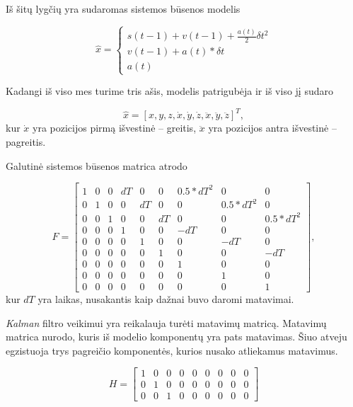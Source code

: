 Iš šitų lygčių yra sudaromas sistemos būsenos modelis

\begin{equation}
    \hat{x} = \begin{cases}
        s(t-1) + v(t-1) + \frac{a(t)}{2}\delta t^2 \\
        v(t-1) + a(t) * \delta t \\
        a(t)
    \end{cases}
\end{equation}

Kadangi iš viso mes turime tris ašis, modelis patrigubėja ir iš viso jį sudaro

\begin{equation}
    \hat{x} = [ x, y, z, \dot{x}, \dot{y}, \dot{z}, \ddot{x}, \ddot{y}, \ddot{z}]^T,
\end{equation}
kur $\dot{x}$ yra pozicijos pirmą išvestinė -- greitis, $\ddot{x}$ yra pozicijos antra išvestinė -- pagreitis.

Galutinė sistemos būsenos matrica atrodo

\begin{equation}
    F = \begin{bmatrix}
        1 & 0 & 0 & dT & 0 & 0 & 0.5*dT^2 & 0 & 0 \\
        0 & 1 & 0 & 0 & dT & 0 & 0 & 0.5*dT^2 & 0 \\
        0 & 0 & 1 & 0 & 0 & dT & 0 & 0 & 0.5*dT^2 \\
        0 & 0 & 0 & 1 & 0 & 0 & -dT & 0 & 0 \\
        0 & 0 & 0 & 0 & 1 & 0 & 0 & -dT & 0 \\
        0 & 0 & 0 & 0 & 0 & 1 & 0 & 0 & -dT \\
        0 & 0 & 0 & 0 & 0 & 0 & 1 & 0 & 0 \\
        0 & 0 & 0 & 0 & 0 & 0 & 0 & 1 & 0 \\
        0 & 0 & 0 & 0 & 0 & 0 & 0 & 0 & 1
    \end{bmatrix},
\end{equation}
kur $dT$ yra laikas, nusakantis kaip dažnai buvo daromi matavimai.

\textit{Kalman} filtro veikimui yra reikalauja turėti matavimų matricą.
Matavimų matrica nurodo, kuris iš modelio komponentų yra pats matavimas.
Šiuo atveju egzistuoja trys pagreičio komponentės, kurios nusako atliekamus matavimus.

\begin{equation}
    H = \begin{bmatrix}
        1 & 0 & 0 & 0 & 0 & 0 & 0 & 0 & 0 \\
        0 & 1 & 0 & 0 & 0 & 0 & 0 & 0 & 0 \\
        0 & 0 & 1 & 0 & 0 & 0 & 0 & 0 & 0
    \end{bmatrix}
\end{equation}

